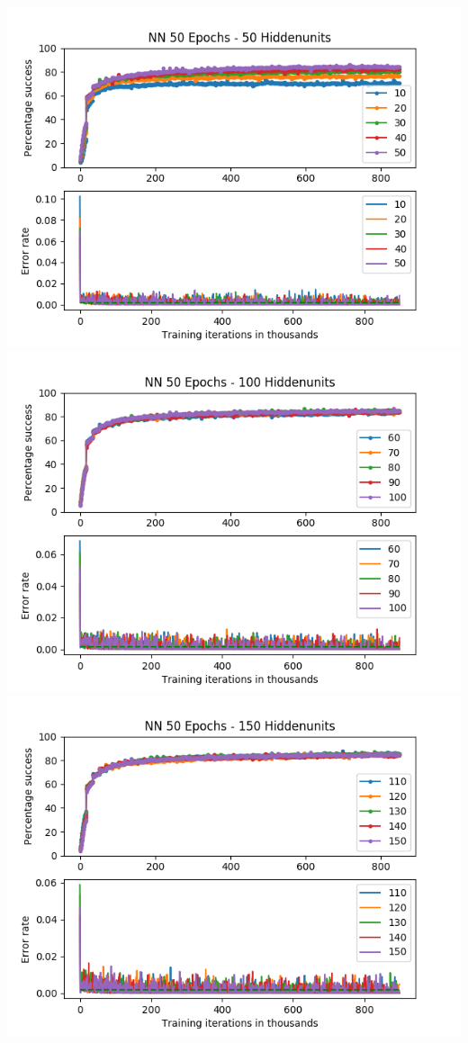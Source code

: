 \documentclass[11pt]{article}
\makeatletter
\def\maxwidth{\ifdim\Gin@nat@width>\linewidth\linewidth
    \else\Gin@nat@width\fi}
\let\Oldincludegraphics\includegraphics
\renewcommand{\includegraphics}[1]{\Oldincludegraphics[width=.8\maxwidth]{#1}}
\makeatother
\begin{document}
\includegraphics{50Epochs_Momentum_03_Experiment3/NN_50Epochs_50Hiddenunits.png}
\includegraphics{50Epochs_Momentum_03_Experiment3/NN_50Epochs_100Hiddenunits.png}
\includegraphics{50Epochs_Momentum_03_Experiment3/NN_50Epochs_150Hiddenunits.png}
\end{document}
